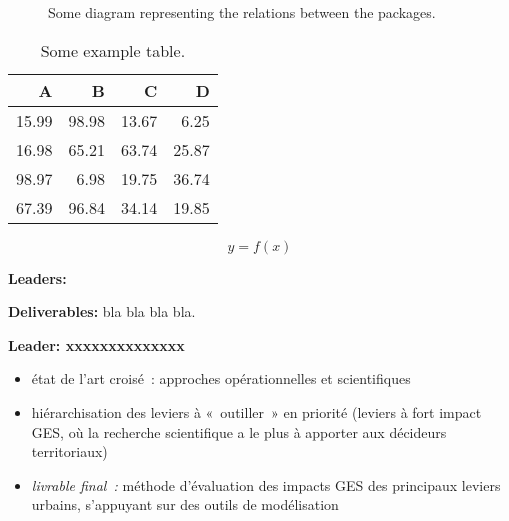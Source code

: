 \begin{figure}[!ht]
	\centering
    \caption{Some diagram representing the relations between the packages.}
    \label{fig:example}
\end{figure}

\lipsum[7]

\begin{table}[!ht]
	\centering
    \begin{tabular}{r r r r}
    	\hline
        \rowcolor{headcolor!20}
    	\textbf{A} & \textbf{B} & \textbf{C} & \textbf{D} \\
    	\hline
        15.99 & 98.98 & 13.67 &  6.25 \\
        16.98 & 65.21 & 63.74 & 25.87 \\
        98.97 &  6.98 & 19.75 & 36.74 \\
        67.39 & 96.84 & 34.14 & 19.85 \\
    	\hline
	\end{tabular}
    \caption{Some example table.}
    \label{tab:example}
\end{table}

\lipsum[8]

\begin{equation}
	y = f(x)
    \label{eq:example}
\end{equation}


\textbf{Leaders:  }


\vspace{0.25cm}
\noindent\textbf{Deliverables:} bla bla bla bla.





\textbf{Leader: xxxxxxxxxxxxxx}


\begin{itemize}
    \item état de l’art croisé : approches opérationnelles et scientifiques
    \item hiérarchisation des leviers à « outiller » en priorité (leviers à fort impact GES, où la recherche scientifique a le plus à apporter aux décideurs territoriaux)
    \item \textit{livrable final : }méthode d’évaluation des impacts GES des principaux leviers urbains, s’appuyant sur des outils de modélisation
\end{itemize}


